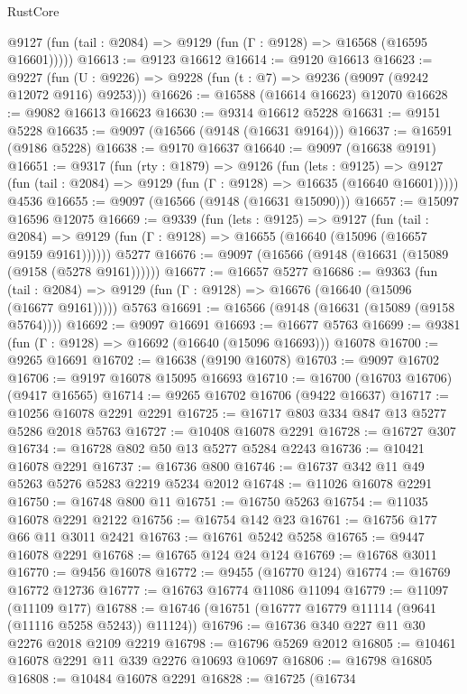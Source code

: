 \begin{lexlean}{RustCore}
\begin{coremodule}
      @9127 (fun (tail : @2084) => @9129 (fun (Γ : @9128) => @16568 (@16595 @16601)))))
@16613 := @9123 @16612
@16614 := @9120 @16613
@16623 := @9227
    (fun (U : @9226) => @9228 (fun (t : @7) => @9236 (@9097 (@9242 @12072 @9116) @9253)))
@16626 := @16588 (@16614 @16623) @12070
@16628 := @9082 @16613 @16623
@16630 := @9314 @16612 @5228
@16631 := @9151 @5228
@16635 := @9097 (@16566 (@9148 (@16631 @9164)))
@16637 := @16591 (@9186 @5228)
@16638 := @9170 @16637
@16640 := @9097 (@16638 @9191)
@16651 := @9317
    (fun (rty : @1879) =>
    @9126
      (fun (lets : @9125) =>
      @9127 (fun (tail : @2084) => @9129 (fun (Γ : @9128) => @16635 (@16640 @16601)))))
    @4536
@16655 := @9097 (@16566 (@9148 (@16631 @15090)))
@16657 := @15097 @16596 @12075
@16669 := @9339
    (fun (lets : @9125) =>
    @9127
      (fun (tail : @2084) =>
      @9129 (fun (Γ : @9128) => @16655 (@16640 (@15096 (@16657 @9159 @9161))))))
    @5277
@16676 := @9097 (@16566 (@9148 (@16631 (@15089 (@9158 (@5278 @9161))))))
@16677 := @16657 @5277
@16686 := @9363
    (fun (tail : @2084) => @9129 (fun (Γ : @9128) => @16676 (@16640 (@15096 (@16677 @9161)))))
    @5763
@16691 := @16566 (@9148 (@16631 (@15089 (@9158 @5764))))
@16692 := @9097 @16691
@16693 := @16677 @5763
@16699 := @9381 (fun (Γ : @9128) => @16692 (@16640 (@15096 @16693))) @16078
@16700 := @9265 @16691
@16702 := @16638 (@9190 @16078)
@16703 := @9097 @16702
@16706 := @9197 @16078 @15095 @16693
@16710 := @16700 (@16703 @16706) (@9417 @16565)
@16714 := @9265 @16702 @16706 (@9422 @16637)
@16717 := @10256 @16078 @2291 @2291
@16725 := @16717 @803 @334 @847 @13 @5277 @5286 @2018 @5763
@16727 := @10408 @16078 @2291
@16728 := @16727 @307
@16734 := @16728 @802 @50 @13 @5277 @5284 @2243
@16736 := @10421 @16078 @2291
@16737 := @16736 @800
@16746 := @16737 @342 @11 @49 @5263 @5276 @5283 @2219 @5234 @2012
@16748 := @11026 @16078 @2291
@16750 := @16748 @800 @11
@16751 := @16750 @5263
@16754 := @11035 @16078 @2291 @2122
@16756 := @16754 @142 @23
@16761 := @16756 @177 @66 @11 @3011 @2421
@16763 := @16761 @5242 @5258
@16765 := @9447 @16078 @2291
@16768 := @16765 @124 @24 @124
@16769 := @16768 @3011
@16770 := @9456 @16078
@16772 := @9455 (@16770 @124)
@16774 := @16769 @16772 @12736
@16777 := @16763 @16774 @11086 @11094
@16779 := @11097 (@11109 @177)
@16788 := @16746 (@16751 (@16777 @16779 @11114 (@9641 (@11116 @5258 @5243)) @11124))
@16796 := @16736 @340 @227 @11 @30 @2276 @2018 @2109 @2219
@16798 := @16796 @5269 @2012
@16805 := @10461 @16078 @2291 @11 @339 @2276 @10693 @10697
@16806 := @16798 @16805
@16808 := @10484 @16078 @2291
@16828 := @16725
    (@16734

\end{coremodule}
\end{lexlean}
